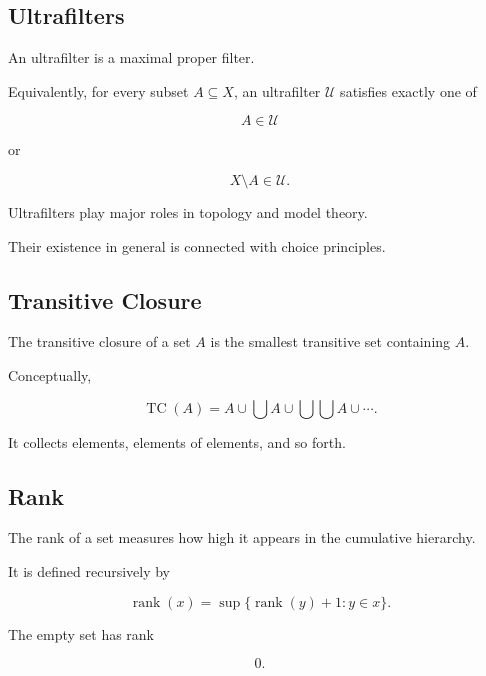 \subsection{Ultrafilters}
\label{subsec:ultrafilters-preview}

An ultrafilter is a maximal proper filter.

Equivalently, for every subset \(A\subseteq X\), an ultrafilter
\(\mathcal{U}\) satisfies exactly one of

\[
\boxed{
A\in\mathcal{U}
}
\]

or

\[
\boxed{
X\setminus A\in\mathcal{U}.
}
\]

Ultrafilters play major roles in topology and model theory.

Their existence in general is connected with choice principles.

\subsection{Transitive Closure}
\label{subsec:transitive-closure-set-theory}

The transitive closure of a set \(A\) is the smallest transitive set
containing \(A\).

Conceptually,

\[
\boxed{
\operatorname{TC}(A)
=
A
\cup
\bigcup A
\cup
\bigcup\bigcup A
\cup
\cdots.
}
\]

It collects elements, elements of elements, and so forth.

\subsection{Rank}
\label{subsec:set-theoretic-rank}

The rank of a set measures how high it appears in the cumulative hierarchy.

It is defined recursively by

\[
\boxed{
\operatorname{rank}(x)
=
\sup
\{
\operatorname{rank}(y)+1:
y\in x
\}.
}
\]

The empty set has rank

\[
\boxed{
0.
}
\]


